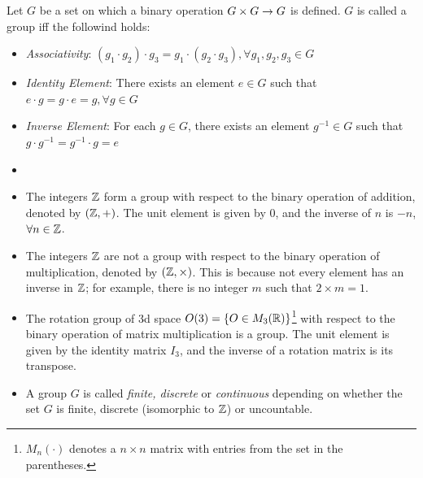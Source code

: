 \begin{definition}[Group]
    Let $G$ be a set on which a binary operation $G \times G \rightarrow G$ is defined. $G$ is called a group iff the followind holds:
    \begin{itemize}
        \item \emph{Associativity}: $(g_1 \cdot g_2) \cdot g_3 = g_1 \cdot (g_2 \cdot g_3), \forall g_1, g_2, g_3 \in G$
        \item \emph{Identity Element}: There exists an element $e \in G$ such that $e \cdot g = g \cdot e = g, \forall g \in G$
        \item \emph{Inverse Element}: For each $g \in G$, there exists an element $g^{-1} \in G$ such that $g \cdot g^{-1} = g^{-1} \cdot g = e$
    \end{itemize}
\end{definition}
\begin{ex}
    \begin{itemize}
        \item
        \item The integers $\mathbb{Z}$ form a group with respect to the binary operation of addition, denoted by $(\mathbb{Z},+)$. The unit element is given by $0$, and the inverse of $n$ is $-n$, $\forall n \in \mathbb{Z}$.
        \item The integers $\mathbb{Z}$ are not a group with respect to the binary operation of multiplication, denoted by $(\mathbb{Z}, \times)$. This is because not every element has an inverse in $\mathbb{Z}$; for example, there is no integer $m$ such that $2 \times m = 1$.
        \item The rotation group of 3d space $O(3) = \left\{O \in M_3(\mathbb{R})\right\}$\footnote{$M_n(\cdot)$ denotes a $n \times n$ matrix with entries from the set in the parentheses.} with respect to the binary operation of matrix multiplication is a group. The unit element is given by the identity matrix $I_3$, and the inverse of a rotation matrix is its transpose.
    \end{itemize}
\end{ex}

\begin{definition}
    \begin{itemize}
        \item A group $G$ is called \emph{finite, discrete} or \emph{continuous} depending on whether the set $G$ is finite, discrete (isomorphic to $\mathbb{Z}$) or uncountable.
    \end{itemize}
\end{definition}




